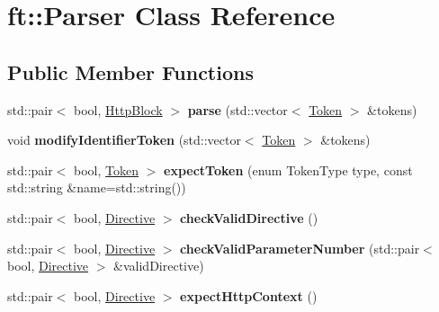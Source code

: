 \hypertarget{classft_1_1Parser}{}\section{ft\+:\+:Parser Class Reference}
\label{classft_1_1Parser}
\subsection*{Public Member Functions}
\begin{DoxyCompactItemize}
\item 
\mbox{\label{classft_1_1Parser_af9c087eb8856a4b69c618089ecbe2ab0}} 
std\+::pair$<$ bool, \hyperlink{classft_1_1HttpBlock}{Http\+Block} $>$ {\bfseries parse} (std\+::vector$<$ \hyperlink{classft_1_1Token}{Token} $>$ \&tokens)
\item 
\mbox{\label{classft_1_1Parser_a91f10286e635ea2d94b7f078637ee0d3}} 
void {\bfseries modify\+Identifier\+Token} (std\+::vector$<$ \hyperlink{classft_1_1Token}{Token} $>$ \&tokens)
\item 
\mbox{\label{classft_1_1Parser_a9a5c9684c424e68b6d3ce5616b898dc9}} 
std\+::pair$<$ bool, \hyperlink{classft_1_1Token}{Token} $>$ {\bfseries expect\+Token} (enum Token\+Type type, const std\+::string \&name=std\+::string())
\item 
\mbox{\label{classft_1_1Parser_a21c74059d21bc75efa2aa9173a0ceeff}} 
std\+::pair$<$ bool, \hyperlink{classft_1_1Directive}{Directive} $>$ {\bfseries check\+Valid\+Directive} ()
\item 
\mbox{\label{classft_1_1Parser_ae5f56d01502ad6ea911112e5f2d68182}} 
std\+::pair$<$ bool, \hyperlink{classft_1_1Directive}{Directive} $>$ {\bfseries check\+Valid\+Parameter\+Number} (std\+::pair$<$ bool, \hyperlink{classft_1_1Directive}{Directive} $>$ \&valid\+Directive)
\item 
\mbox{\label{classft_1_1Parser_a5795bc9f048d5f2ed8969e4c2bf92d76}} 
std\+::pair$<$ bool, \hyperlink{classft_1_1Directive}{Directive} $>$ {\bfseries expect\+Http\+Context} ()
\item 
\mbox{\label{classft_1_1Parser_a68dbbe7bce0f7c35c25511e31655cddc}} 

\end{DoxyCompactItemize}
